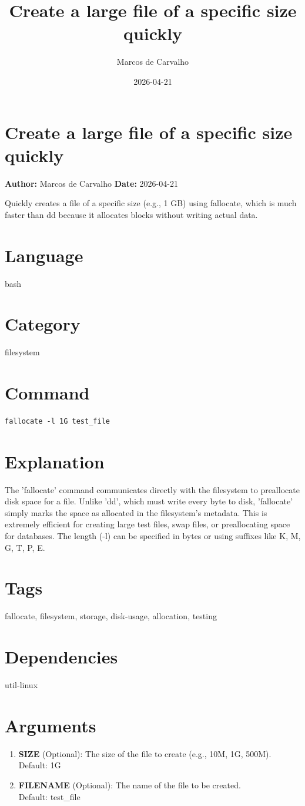 \documentclass{article}
\title{Create a large file of a specific size quickly}
\author{Marcos de Carvalho}
\date{2026-04-21}
\begin{document}
\section*{Create a large file of a specific size quickly}
\textbf{Author:} Marcos de Carvalho \hfill \textbf{Date:} 2026-04-21

\noindent Quickly creates a file of a specific size (e.g., 1 GB) using fallocate, which is much faster than dd because it allocates blocks without writing actual data.

\section*{Language}
bash

\section*{Category}
filesystem

\section*{Command}
\begin{lstlisting}
fallocate -l 1G test_file
\end{lstlisting}

\section*{Explanation}
The 'fallocate' command communicates directly with the filesystem to preallocate disk space for a file. Unlike 'dd', which must write every byte to disk, 'fallocate' simply marks the space as allocated in the filesystem's metadata. This is extremely efficient for creating large test files, swap files, or preallocating space for databases. The length (-l) can be specified in bytes or using suffixes like K, M, G, T, P, E.

\section*{Tags}
fallocate, filesystem, storage, disk-usage, allocation, testing

\section*{Dependencies}
util-linux


\section*{Arguments}
\begin{enumerate}
  \item \textbf{SIZE} (Optional): The size of the file to create (e.g., 10M, 1G, 500M). \\ Default: 1G
  \item \textbf{FILENAME} (Optional): The name of the file to be created. \\ Default: test\_file
\end{enumerate}
\end{document}
